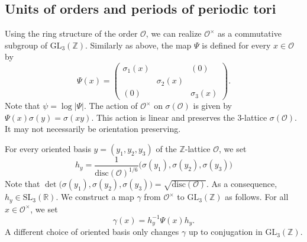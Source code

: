 \documentclass[11pt,letterpaper]{amsart}
\theoremstyle{definition}
\theoremstyle{remark}
\renewcommand{\rm}[1]{\mathrm{#1}}
\newcommand{\cal}[1]{\mathcal{#1}}
\newcommand{\bb}[1]{\mathbb{#1}}
\newcommand{\R}{\bb R}
\newcommand{\Z}{\bb Z}
\newcommand{\calO}{\cal O}
\newcommand{\SL}{\rm{SL}}
\newcommand{\GL}{\rm{GL}}
\begin{document}
	\subsection{Units of orders and periods of periodic tori}
	\label{ss:orders}
Using the ring structure of the order $\calO$, we can realize $\calO^\times$ as a commutative subgroup of $\GL_3(\Z)$. 
	Similarly as above, the map $\Psi$ is defined for every $x\in \calO$ by
	$$\Psi (x) = \begin{pmatrix}
		\sigma_1(x) &  & (0) \\
		& \sigma_2(x) & \\
		(0) & & \sigma_3(x)
	\end{pmatrix}
	. $$
	Note that $\psi = \log \vert \Psi \vert$. 
	The action of $\calO^\times$ on $\sigma(\calO)$ is given by $\Psi(x)\sigma(y)=\sigma(xy)$. 
	This action is linear and preserves the $3$-lattice $\sigma(\calO)$. It may not necessarily be orientation preserving.

For every oriented basis $y = (y_1,y_2,y_3)$ of the $\Z$-lattice $\calO$, we set
\begin{equation}\label{eq-def-h_y}
h_y= \frac{1}{\rm{disc} (\calO)^{1/6} } \big(\sigma(y_1), \sigma(y_2),\sigma(y_3)\big)
\end{equation}
Note that $\det\big(\sigma(y_1), \sigma(y_2),\sigma(y_3) \big)=\sqrt{\rm{disc}(\calO)}$. As a consequence, $h_y \in \SL_3(\R)$.
We construct a map $\gamma$ from $\calO^\times$ to $\GL_3(\Z)$ as follows. 
For all $x\in \calO^\times$, we set
	\[ \gamma(x)=  h_y^{-1} \Psi(x) h_y. \]
A different choice of oriented basis only changes $\gamma$ up to conjugation in $\GL_3(\Z)$. 
	
\end{document}
